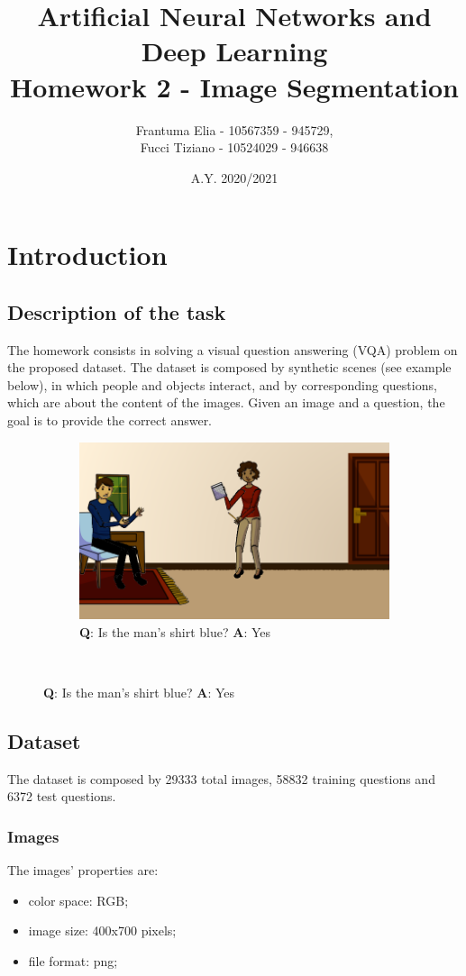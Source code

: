 \documentclass[12pt,a4paper]{report}
\title{Artificial Neural Networks and Deep Learning \\ Homework 2 - Image Segmentation}
\author{Frantuma Elia - 10567359 - 945729, \\
		Fucci Tiziano - 10524029 - 946638}
\date{A.Y. 2020/2021}
\begin{document}
	\maketitle
	\tableofcontents
	\chapter{Introduction}
		\section{Description of the task}
			The homework consists in solving a visual question answering (VQA) problem on the proposed dataset. The dataset is composed by synthetic scenes (see example below), in which people and objects interact, and by corresponding questions, which are about the content of the images. Given an image and a question, the goal is to provide the correct answer.

\begin{figure}[H]
\renewcommand*\thesubfigure{\arabic{subfigure}} 
\centering
\begin{subfigure}{.75\textwidth}
  \centering
  \includegraphics[width=1\linewidth]{image0}
  \caption{\textbf{Q}: Is the man's shirt blue? \textbf{A}: Yes}
  \label{fig:sub1}
\end{subfigure}\
\end{figure}

\section{Dataset}
The dataset is composed by 29333 total images, 58832 training questions and 6372 test questions.


	\subsection{Images}
The images' properties are:
\begin{itemize}
\item{color space: RGB;}
\item{image size: 400x700 pixels;}
\item{file format: png;}
\end{itemize}
\end{document}

